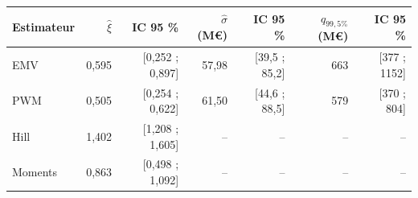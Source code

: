 \scriptsize\renewcommand{\arraystretch}{1.45}
\begin{tabularx}{\textwidth}{Yrrrrrr}\toprule
Estimateur & $\hat\xi$ & IC 95 \% & $\hat\sigma$ (M€) & IC 95 \% & $q_{99,5\%}$ (M€) & IC 95 \% \\\midrule
EMV & 0{,}595 & [0{,}252 ; 0{,}897] & 57{,}98 & [39{,}5 ; 85{,}2] & 663 & [377 ; 1152] \\
PWM & 0{,}505 & [0{,}254 ; 0{,}622] & 61{,}50 & [44{,}6 ; 88{,}5] & 579 & [370 ; 804] \\
Hill & 1{,}402 & [1{,}208 ; 1{,}605] & -- & -- & -- & -- \\
Moments & 0{,}863 & [0{,}498 ; 1{,}092] & -- & -- & -- & -- \\
\bottomrule\end{tabularx}
